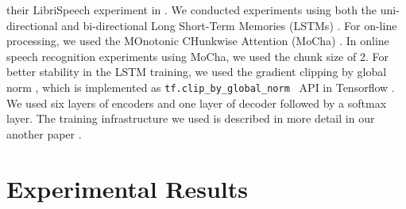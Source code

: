 \documentclass[a4paper]{article}
\makeatletter
\newcommand{\specialcell}[2][c]{%
     \begin{tabular}[#1]{@{}c@{}}#2\end{tabular}}
\makeatother
\begin{document}
their LibriSpeech experiment in \cite{a_zeyer_interspeech_2018_00}. 
We conducted experiments using both the
uni-directional and bi-directional Long Short-Term Memories  (LSTMs)
\cite{S_Hochreiter_neural_computation_1997_00}. 
For on-line processing, we used the MOnotonic CHunkwise Attention 
(MoCha) \cite{c_chiu_iclr_2018_00}. 
In online speech recognition experiments using MoCha, we used the chunk
size of 2.
 For better 
stability in the LSTM training, we used the gradient clipping by 
global norm \cite{r_pascanu_icml_2013}, which is implemented as 
{\tt tf.clip\_by\_global\_norm } API in Tensorflow  \cite{m_abadi_usenix_2016}.
We used six layers of encoders and one layer of decoder followed by a softmax 
layer. The training infrastructure we used is described in more detail in 
our another paper \cite{c_kim_asru_2019_01}.
%
%
\section{Experimental Results}
\label{sec:experimental_results}
\end{document}
